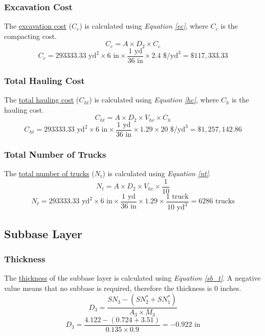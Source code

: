 \documentclass{article}
\begin{document}
\subsubsection{Excavation Cost} 
\noindent The \underline{excavation cost} ($C_e$) is calculated using \emph{Equation \ref{ec}}, where $C_c$ is the compacting cost.
\begin{equation}\label{ec}C_e=A\times D_2\times C_c\end{equation}
\[C_e=293333.33\text{ yd}^2\times 6\text{ in}\times\frac{1\text{ yd}}{36\text{ in}} \times 2.4\text{ \$/yd}^3=\boxed{\$117,333.33}\] 
\subsubsection{Total Hauling Cost}
\noindent The \underline{total hauling cost} ($C_{ht}$) is calculated using \emph{Equation \ref{hc}}, where $C_h$ is the hauling cost.
\begin{equation}\label{hc}C_{ht}=A\times D_2\times V_{hv}\times C_h\end{equation}
\[C_{ht}=293333.33\text{ yd}^2\times 6\text{ in}\times\frac{1\text{ yd}}{36\text{ in}}\times 1.29\times 20\text{ \$/yd}^3=\boxed{\$1,257,142.86}\]
\subsubsection{Total Number of Trucks}
\noindent The \underline{total number of trucks} ($N_{t}$) is calculated using \emph{Equation \ref{nt}}.
\begin{equation}\label{nt}N_{t}=A\times D_2\times V_{hv}\times \frac{1}{10}\end{equation}
\[N_{t}=293333.33\text{ yd}^2\times 6\text{ in}\times\frac{1\text{ yd}}{36\text{ in}}\times 1.29\times \frac{1\text{ truck}}{10\text{ yd}^3}=\boxed{6286\text{ trucks}}\]
\subsection{Subbase Layer}
\subsubsection{Thickness}
\noindent The \underline{thickness} of the subbase layer is calculated using \emph{Equation \ref{sb_t}}. A negative value means that no subbase is required, therefore the thickness is 0 inches.
\begin{equation}\label{sb_t}D_3=\frac{SN_3-(SN_2^*+SN_1^*)}{A_3\times M_3}\end{equation}
\[D_3=\frac{4.122-(0.724+3.51)}{0.135\times 0.9}=\boxed{-0.922\text{ in}}\]
\end{document}
